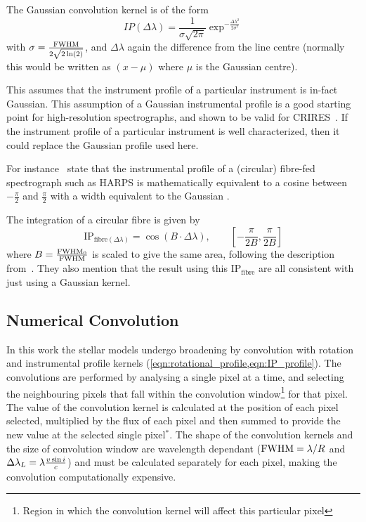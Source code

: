 The Gaussian convolution kernel is of the form
\begin{equation}
IP(\Delta\lambda) = \frac{1}{\sigma \sqrt{2\pi}} \exp^{-\frac{{\Delta\lambda}^{2}}{2 {\sigma}^{2}}}
\label{eqn:IP_profile}
\end{equation}
with $\sigma = \frac{\textrm{FWHM}}{2\sqrt{2 \ln(2)}}$, and $\Delta \lambda$ again the difference from the line centre (normally this would be written as $(x-\mu)$ where $\mu$ is the Gaussian centre).

This assumes that the instrument profile of a particular instrument is in-fact Gaussian.
This assumption of a Gaussian instrumental profile is a good starting point for high-resolution spectrographs, and shown to be valid for CRIRES~\citep{seifahrt_synthesising_2010}.
If the instrument profile of a particular instrument is well characterized, then it could replace the Gaussian profile used here.

For instance~\citet{artigau_optical_2018}  state that the instrumental profile of a (circular) fibre-fed spectrograph such as {HARPS} is mathematically equivalent to a cosine between $-\frac{\pi}{2}$ and $\frac{\pi}{2}$ with a width equivalent to the Gaussian {\fwhm}.

The integration of a circular fibre is given by
\begin{equation}
\textrm{IP}_{\textrm{fibre}(\Delta\lambda)} = \cos(B\cdot\Delta\lambda) ,  \hspace{2em} [-\frac{\pi}{2 B}, \frac{\pi}{2 B}]
\end{equation}
where {$B = \frac{\textrm{FWHM}_{0}}{\textrm{FWHM}}$ } is scaled to give the same area,
following the description from~\citet{artigau_optical_2018}.
They also mention that the result using this $\textrm{IP}_{\textrm{fibre}}$ are all consistent with just using a Gaussian kernel.

\subsection{Numerical Convolution}
\label{subsec:numerical_convolution}
In this work the stellar models undergo broadening by convolution with rotation and instrumental profile kernels (\cref{eqn:rotational_profile,eqn:IP_profile}).
The convolutions are performed by analysing a single pixel at a time, and selecting the neighbouring pixels that fall within the convolution window\footnote{Region in which the convolution kernel will affect this particular pixel} for that pixel.
The value of the convolution kernel is calculated at the position of each pixel selected, multiplied by the flux of each pixel and then summed to provide the new value at the selected single pixel{$^{\textbf{*}}$}.
 The shape of the convolution kernels and the size of convolution window are wavelength dependant (${\textrm{FWHM}}=\lambda / R$ and $\Delta\lambda_{L}=\lambda \frac{v\sin{i}}{c}$) and must be calculated separately for each pixel, making the convolution computationally expensive.

